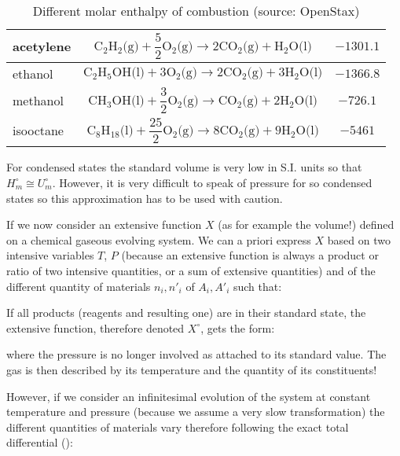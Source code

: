 \begin{enumerate}
\begin{table}[H]
{\begin{tabular}{|l|c|c|}
			acetylene & $\mathrm{C}_2\mathrm{H}_2\text{(g)}+\dfrac{5}{2}\mathrm{O}_2\text{(g)}\rightarrow 2\mathrm{CO}_2\text{(g)}+\mathrm{H}_2\mathrm{O}\text{(l)}$ & $-1301.1$ \\ \hline
			ethanol & $\mathrm{C}_2\mathrm{H}_5\mathrm{OH}\text{(l)}+3\mathrm{O}_2\text{(g)}\rightarrow 2\mathrm{CO}_2\text{(g)}+3\mathrm{H}_2\mathrm{O}\text{(l)}$ & $-1366.8$ \\ \hline
			methanol & $\mathrm{CH}_3\mathrm{OH}\text{(l)}+\dfrac{3}{2}\mathrm{O}_2\text{(g)}\rightarrow \mathrm{CO}_2\text{(g)}+2\mathrm{H}_2\mathrm{O}\text{(l)}$ & $-726.1$ \\ \hline
			isooctane & $\mathrm{C}_8\mathrm{H}_{18}\text{(l)}+\dfrac{25}{2}\mathrm{O}_2\text{(g)}\rightarrow 8\mathrm{CO}_2\text{(g)}+9\mathrm{H}_2\mathrm{O}\text{(l)}$ & $-5461$ \\ \hline
			\end{tabular}}
			\caption[Different molar enthalpy of combustion]{Different molar enthalpy of combustion (source: OpenStax)}
		\end{table}
	\end{enumerate}
	\begin{tcolorbox}[title=Remark,arc=10pt,breakable,drop lifted shadow,
  skin=enhanced,
  skin first is subskin of={enhancedfirst}{arc=10pt,no shadow},
  skin middle is subskin of={enhancedmiddle}{arc=10pt,no shadow},
  skin last is subskin of={enhancedlast}{drop lifted shadow}]
	For condensed states the standard volume is very low in S.I. units so that $H_m^\circ\cong U_m^\circ$. However, it is very difficult to speak of pressure for so condensed states so this approximation has to be used with caution.
	\end{tcolorbox}	
	If we now consider an extensive function $X$ (as for example the volume!) defined on a chemical gaseous evolving system. We can a priori express $X$ based on two intensive variables $T$, $P$ (because an extensive function is always a product or ratio of two intensive quantities, or a sum of extensive quantities) and of the different quantity of materials $n_i,{n'}_i$ of $A_i,{A'}_i$ such that:
	
	If all products (reagents and resulting one) are in their standard state, the extensive function, therefore denoted $X^\circ$, gets the form:
	
	where the pressure is no longer involved as attached to its standard value. The gas is then described by its temperature and the quantity of its constituents!
	
	However, if we consider an infinitesimal evolution of the system at constant temperature and pressure (because we assume a very slow transformation) the different quantities of materials vary therefore following the exact total differential ():
	
